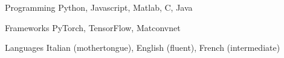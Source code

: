 

\begin{cvskills}

  \cvskill
    {Programming} %
    {Python, Javascript, Matlab, C, Java} %

  \cvskill
    {Frameworks} %
    {PyTorch, TensorFlow, Matconvnet} %

  \cvskill
    {Languages} %
    {Italian (mothertongue), English (fluent), French (intermediate)} %

\end{cvskills}
